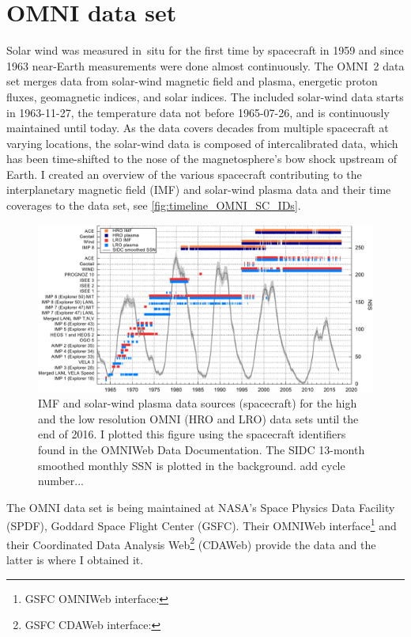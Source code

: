 \section{OMNI data set}
\label{sec:omni_data_set}
Solar wind was measured in~situ for the first time by spacecraft in 1959 and since 1963 near-Earth measurements were done almost continuously. The OMNI~2 data set \citep{King2005} merges data from solar-wind magnetic field and plasma, energetic proton fluxes, geomagnetic indices, and solar indices. The included solar-wind data starts in \mbox{1963-11-27}, the temperature data not before \mbox{1965-07-26}, and is continuously maintained until today. As the data covers decades from multiple spacecraft at varying locations, the solar-wind data is composed of intercalibrated data, which has been time-shifted to the nose of the magnetosphere's bow shock upstream of Earth. I created an overview of the various spacecraft contributing to the interplanetary magnetic field (IMF) and solar-wind plasma data and their time coverages to the data set, see \autoref{fig:timeline_OMNI_SC_IDs}.
\begin{figure}[htb]
	\centering
	\includegraphics[width=\textwidth]{figures_of_mine/gnuplots/timeline_OMNI_SC_IDs.pdf}
	\caption{IMF and solar-wind plasma data sources (spacecraft) for the high and the low resolution OMNI (HRO and LRO) data sets until the end of 2016. I plotted this figure using the spacecraft identifiers found in the OMNIWeb Data Documentation\protect\footnotemark. The SIDC 13-month smoothed monthly SSN is plotted in the background. add cycle number...}
	\label{fig:timeline_OMNI_SC_IDs}
\end{figure}

The OMNI data set is being maintained at NASA's Space Physics Data Facility (SPDF), Goddard Space Flight Center (GSFC). Their OMNIWeb interface\footnote{GSFC OMNIWeb interface: } and their Coordinated Data Analysis Web\footnote{GSFC CDAWeb interface: } (CDAWeb) provide the data and the latter is where I obtained it.


